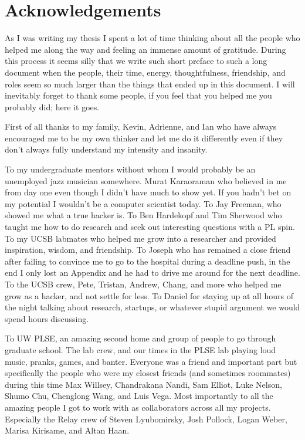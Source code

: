 \section{Acknowledgements}

As I was writing my thesis I spent a lot of time
    thinking about all the people who helped me along the way
    and feeling an immense amount of gratitude.
During this process it seems silly that we write such short preface to such a long
    document when the people, their time, energy, thoughtfulness, friendship,
    and roles seem so much larger than the things that ended up in this
    document.
I will inevitably forget to thank some people,
    if you feel that you helped me you probably did; here it goes.

First of all thanks to my family, Kevin, Adrienne, and Ian who have always encouraged
    me to be my own thinker and let me do it differently even if they don't always fully
    understand my intensity and insanity.

To my undergraduate mentors without whom I would probably be an unemployed
    jazz musician somewhere.
Murat Karaoraman who believed in me from day one even though
    I didn't have much to show yet.
If you hadn't bet on my potential
    I wouldn't be a computer scientist today.
To Jay Freeman, who showed me what a true
    hacker is.
To Ben Hardekopf and Tim Sherwood who taught me how to do research
    and seek out interesting questions with a PL spin.
To my UCSB labmates who helped me grow into a researcher and
    provided inspiration, wisdom, and friendship.
To Joseph who has remained a close friend after failing to
    convince me to go to the hospital during a deadline push,
    in the end I only lost an Appendix and he had to drive me around
    for the next deadline.
To the UCSB crew, Pete, Tristan, Andrew, Chang, and more who helped me grow
    as a hacker, and not settle for less.
To Daniel for staying up at all hours of the night talking about research,
    startups, or whatever stupid argument we would spend hours discussing.

To UW PLSE, an amazing second home and group of people to
    go through graduate school.
The lab crew, and our times in the PLSE lab playing loud
    music, pranks, games, and banter.
Everyone was a friend and  important part but specifically the people
    who were my closest friends (and sometimes roommates)
    during this time Max Willsey, Chandrakana Nandi,
    Sam Elliot, Luke Nelson, Shumo Chu, Chenglong Wang, and Luis Vega.
Most importantly to all the amazing people I got to work
    with as collaborators across all my projects.
Especially the Relay crew of Steven Lyubomirsky,
    Josh Pollock, Logan Weber, Marisa Kirisame, and Altan Haan.

